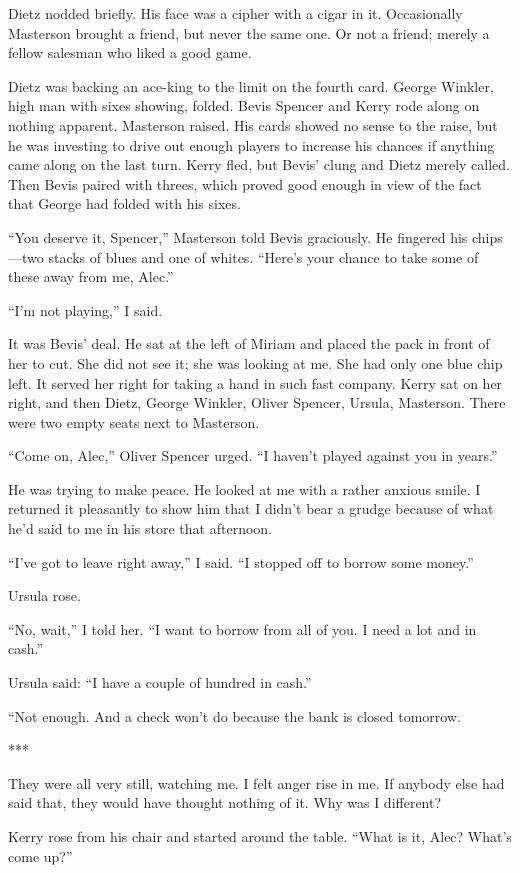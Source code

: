 \documentclass{novel}
\begin{document}
Dietz nodded briefly. His face was a cipher with a cigar in it. Occasionally Masterson brought a friend, but never the same one. Or not a friend; merely a fellow salesman who liked a good game.

Dietz was backing an ace-king to the limit on the fourth card. George Winkler, high man with sixes showing, folded. Bevis Spencer and Kerry rode along on nothing apparent. Masterson raised. His cards showed no sense to the raise, but he was investing to drive out enough players to increase his chances if anything came along on the last turn. Kerry fled, but Bevis’ clung and Dietz merely called. Then Bevis paired with threes, which proved good enough in view of the fact that George had folded with his sixes.

“You deserve it, Spencer,” Masterson told Bevis graciously. He fingered his chips—two stacks of blues and one of whites. “Here’s your chance to take some of these away from me, Alec.”

“I’m not playing,” I said.

It was Bevis’ deal. He sat at the left of Miriam and placed the pack in front of her to cut. She did not see it; she was looking at me. She had only one blue chip left. It served her right for taking a hand in such fast company. Kerry sat on her right, and then Dietz, George Winkler, Oliver Spencer, Ursula, Masterson. There were two empty seats next to Masterson.

“Come on, Alec,” Oliver Spencer urged. “I haven’t played against you in years.”

He was trying to make peace. He looked at me with a rather anxious smile. I returned it pleasantly to show him that I didn’t bear a grudge because of what he’d said to me in his store that afternoon.

“I’ve got to leave right away,” I said. “I stopped off to borrow some money.”

Ursula rose.

“No, wait,” I told her. “I want to borrow from all of you. I need a lot and in cash.”

Ursula said: “I have a couple of hundred in cash.”

“Not enough. And a check won’t do because the bank is closed tomorrow.

***

They were all very still, watching me. I felt anger rise in me. If anybody else had said that, they would have thought nothing of it. Why was I different?

Kerry rose from his chair and started around the table. “What is it, Alec? What’s come up?”
\end{document}
